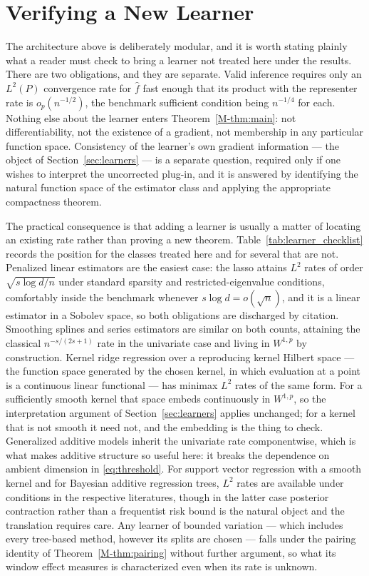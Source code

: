 \documentclass[12pt,a4paper]{article}
\numberwithin{equation}{section}
\theoremstyle{plain}
\theoremstyle{definition}
\begin{document}
	\section{Verifying a New Learner}
	\label{sec:newlearners}
	
	The architecture above is deliberately modular, and it is worth stating plainly
	what a reader must check to bring a learner not treated here under the results.
	There are two obligations, and they are separate. Valid inference requires only
	an $L^2(P)$ convergence rate for $\hat{f}$ fast enough that its product with the
	representer rate is $o_p(n^{-1/2})$, the benchmark sufficient condition being
	$n^{-1/4}$ for each. Nothing else about the learner enters
	Theorem~\ref{M-thm:main}: not differentiability, not the existence of a gradient,
	not membership in any particular function space. Consistency of the learner's
	own gradient information --- the object of Section~\ref{sec:learners} --- is a
	separate question, required only if one wishes to interpret the uncorrected
	plug-in, and it is answered by identifying the natural function space of the
	estimator class and applying the appropriate compactness theorem.
	
	The practical consequence is that adding a learner is usually a matter of
	locating an existing rate rather than proving a new theorem.
	Table~\ref{tab:learner_checklist} records the position for the classes treated
	here and for several that are not. Penalized linear estimators are the easiest
	case: the lasso attains $L^2$ rates of order $\sqrt{s \log d / n}$ under
	standard sparsity and restricted-eigenvalue conditions, comfortably inside the
	benchmark whenever $s \log d = o(\sqrt{n})$, and it is a linear estimator in a
	Sobolev space, so both obligations are discharged by citation. Smoothing splines
	and series estimators are similar on both counts, attaining the classical
	$n^{-s/(2s+1)}$ rate in the univariate case and living in $W^{1,p}$ by
	construction. Kernel ridge regression over a reproducing kernel Hilbert space --- the function
	space generated by the chosen kernel, in which evaluation at a point is a
	continuous linear functional --- has minimax $L^2$ rates of the same form. For a
	sufficiently smooth kernel that space embeds continuously in $W^{1,p}$, so the
	interpretation argument of Section~\ref{sec:learners} applies unchanged; for a
	kernel that is not smooth it need not, and the embedding is the thing to check. Generalized additive models
	inherit the univariate rate componentwise, which is what makes additive
	structure so useful here: it breaks the dependence on ambient dimension in
	\eqref{eq:threshold}. For support vector regression with a smooth kernel and for
	Bayesian additive regression trees, $L^2$ rates are available under conditions
	in the respective literatures, though in the latter case posterior contraction
	rather than a frequentist risk bound is the natural object and the translation
	requires care. Any learner of bounded variation --- which includes every
	tree-based method, however its splits are chosen --- falls under the pairing
	identity of Theorem~\ref{M-thm:pairing} without further argument, so what its
	window effect measures is characterized even when its rate is unknown.
	
\end{document}
